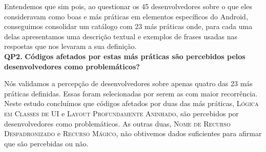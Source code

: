 Entendemos que sim pois, ao questionar os 45 desenvolvedores sobre o que eles consideravam como boas e más práticas em elementos específicos do Android, conseguimos consolidar um catálogo com 23 más práticas onde, para cada uma delas apresentamos uma descrição textual e exemplos de frases usadas nas respostas que nos levaram a sua definição. \\

\textbf{QP2.} \textbf{Códigos afetados por estas más práticas são percebidos pelos desenvolvedores como problemáticos?}

Nós validamos a percepção de desenvolvedores sobre apenas quatro das 23 más práticas definidas. Essas foram selecionadas por serem as com maior recorrência. Neste estudo concluímos que códigos afetados por duas das más práticas, \textsc{Lógica em Classes de UI} e \textsc{Layout Profundamente Aninhado}, são percebidos por desenvolvedores como problemáticos. As outras duas, \textsc{Nome de Recurso Despadronizado} e \textsc{Recurso Mágico}, não obtivemos dados suficientes para afirmar que são percebidas ou não.



